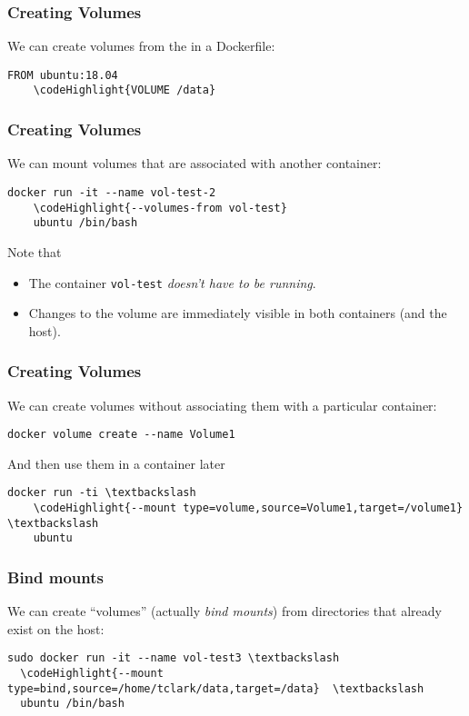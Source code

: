 \documentclass[10pt]{beamer}
\newcommand\codeHighlight[1]{\textcolor[rgb]{1,0,0}{\textbf{#1}}}
\begin{document}
\begin{frame}[fragile]
	\frametitle{Creating Volumes}
	We can create volumes from the in a Dockerfile:
	
	\begin{Verbatim}[commandchars=\\\{\}]
	FROM ubuntu:18.04
	\codeHighlight{VOLUME /data}
	\end{Verbatim}
\end{frame}

\begin{frame}[fragile]
	\frametitle{Creating Volumes}
	We can mount volumes that are associated with another container:
	
	\begin{Verbatim}[commandchars=\\\{\}]
	docker run -it --name vol-test-2 
	\codeHighlight{--volumes-from vol-test} 
	ubuntu /bin/bash
	\end{Verbatim}
	
	Note that 
	\begin{itemize}
		\item The container \texttt{vol-test} \emph{doesn't have to be running}.
		\item Changes to the volume are immediately visible in both containers (and the host).
	\end{itemize}
\end{frame}

\begin{frame}[fragile]
	\frametitle{Creating Volumes}
	We can create volumes without associating them with a particular container:
	
	\begin{Verbatim}[commandchars=\\\{\}]
	docker volume create --name Volume1
	\end{Verbatim}
	
	And then use them in a container later
	\begin{Verbatim}[commandchars=\\\{\}]
	docker run -ti \textbackslash
	\codeHighlight{--mount type=volume,source=Volume1,target=/volume1} \textbackslash
	ubuntu
	\end{Verbatim}

\end{frame}

\begin{frame}[fragile]
	\frametitle{Bind mounts}
	We can create ``volumes'' (actually \emph{bind mounts}) from directories that already exist on the host:
	
	\begin{Verbatim}[commandchars=\\\{\}]
  sudo docker run -it --name vol-test3 \textbackslash
  \codeHighlight{--mount type=bind,source=/home/tclark/data,target=/data}  \textbackslash
  ubuntu /bin/bash
	\end{Verbatim}
\end{frame}
\end{document}
